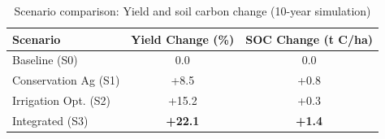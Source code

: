 \begin{table}[ht]
\centering
\caption{Scenario comparison: Yield and soil carbon change (10-year simulation)}
\label{tab:scenarios}
\begin{tabular}{lcc}
\toprule
\textbf{Scenario} & \textbf{Yield Change (\%)} & \textbf{SOC Change (t C/ha)} \\
\midrule
Baseline (S0) & 0.0 & 0.0 \\
Conservation Ag (S1) & +8.5 & +0.8 \\
Irrigation Opt. (S2) & +15.2 & +0.3 \\
Integrated (S3) & \textbf{+22.1} & \textbf{+1.4} \\
\bottomrule
\end{tabular}
\end{table}
